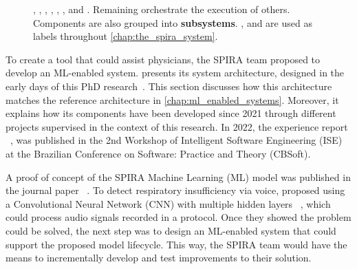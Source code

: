 \begin{figure}[p]
{      \mbox{},
      \mbox{},
      \mbox{},
      \mbox{},
      \mbox{},
      \mbox{}, and
      \mbox{}.
      Remaining  orchestrate
      the execution of others.
    Components are also grouped into \textbf{subsystems}.
    ,
     and
    are used as labels throughout \cref{chap:the_spira_system}.
  }
  \label{fig:spira_architecture}
\end{figure}

To create a tool that could assist physicians, the SPIRA team proposed
to develop an ML-enabled system. 
presents its system architecture, designed in the early days of this PhD
research~\parencite{Ferreira2022SPIRA:Detection}.
This section discusses how this architecture matches the reference
architecture in \cref{chap:ml_enabled_systems}.
Moreover, it explains how its components have been developed since 2021
through different projects supervised in the context of this research.
In 2022, the experience report \emph{}%
~\parencite{Ferreira2022SPIRA:Detection}, was published in the 2nd Workshop
of Intelligent Software Engineering (ISE) at the Brazilian Conference on
Software: Practice and Theory (CBSoft).

A proof of concept of the SPIRA Machine Learning (ML) model was
published in the journal paper \emph{}%
~\parencite{Casanova2021DeepSpeech}. To detect respiratory insufficiency
via voice, \citeauthor{Casanova2021DeepSpeech} proposed using
a Convolutional Neural Network (CNN) with multiple hidden layers%
~\parencite{IanGoodfellow2016DeepLearning,RussellS2021Artificial4th},
which could process audio signals recorded in a protocol.
Once they showed the problem could be solved, the next step
was to design an ML-enabled system that could support the proposed
model lifecycle. This way, the SPIRA team would have the means to
incrementally develop and test improvements to their solution.


